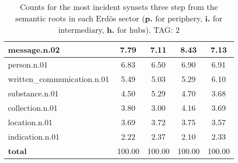 \begin{table}[h!]
\begin{center}
\begin{tabular}{| l || c | c | c | c |}
message.n.02 & 7.79  & 7.11  & 8.43  & 7.13 \\\hline
person.n.01 & 6.83  & 6.50  & 6.90  & 6.91 \\\hline
written\_communication.n.01 & 5.49  & 5.03  & 5.29  & 6.10 \\\hline
substance.n.01 & 4.50  & 5.29  & 4.70  & 3.68 \\\hline
collection.n.01 & 3.80  & 3.00  & 4.16  & 3.69 \\\hline
location.n.01 & 3.69  & 3.72  & 3.75  & 3.57 \\\hline
indication.n.01 & 2.22  & 2.37  & 2.10  & 2.33 \\\hline\hline
{{\bf total}} & 100.00  & 100.00  & 100.00  & 100.00 \\\hline
\end{tabular}
\caption{Counts for the most incident synsets three step from the semantic roots in each Erd\"os sector ({\bf p.} for periphery, {\bf i.} for intermediary, {\bf h.} for hubs). TAG: 2}
\end{center}
\end{table}